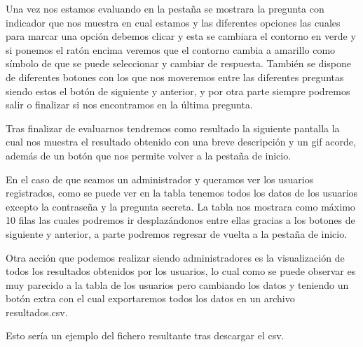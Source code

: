 
Una vez nos estamos evaluando en la pestaña se mostrara la pregunta con indicador que nos muestra en cual estamos y las diferentes opciones las cuales para marcar una opción debemos clicar y esta se cambiara el contorno en verde y si ponemos el ratón encima veremos que el contorno cambia a amarillo como símbolo de que se puede seleccionar y cambiar de respuesta. También se dispone de diferentes botones con los que nos moveremos entre las diferentes preguntas siendo estos el botón de siguiente y anterior, y por otra parte siempre podremos salir o finalizar si nos encontramos en la última pregunta.



Tras finalizar de evaluarnos tendremos como resultado la siguiente pantalla la cual nos muestra el resultado obtenido con una breve descripción y un gif acorde, además de un botón que nos permite volver a la pestaña de inicio.


En el caso de que seamos un administrador y queramos ver los usuarios registrados, como se puede ver en la tabla tenemos todos los datos de los usuarios excepto la contraseña y la pregunta secreta. La tabla nos mostrara como máximo 10 filas las cuales podremos ir desplazándonos entre ellas gracias a los botones de siguiente y anterior, a parte podremos regresar de vuelta a la pestaña de inicio.


Otra acción que podemos realizar siendo administradores es la visualización de todos los resultados obtenidos por los usuarios, lo cual como se puede observar es muy parecido a la tabla de los usuarios pero cambiando los datos y teniendo un botón extra con el cual exportaremos todos los datos en un archivo resultados.csv.


Esto sería un ejemplo del fichero resultante tras descargar el csv.

